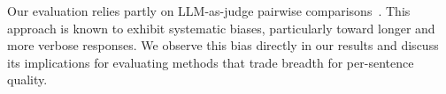 Our evaluation relies partly on LLM-as-judge pairwise comparisons~\citep{zheng2023judging}.
This approach is known to exhibit systematic biases, particularly toward longer and more verbose responses.
We observe this bias directly in our results and discuss its implications for evaluating methods that trade breadth for per-sentence quality.
